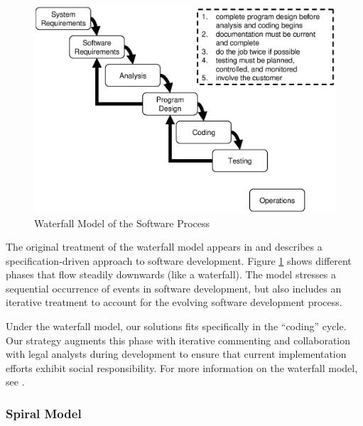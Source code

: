 \begin{figure}
\begin{center}
\includegraphics[scale=0.66]{images/waterfall.eps}
\end{center}
\caption{Waterfall Model of the Software Process}
\label{fig:waterfall}
\end{figure}

The original treatment of the waterfall model appears in \cite{Royce1970} and
describes a specification-driven approach to software development. Figure
\ref{fig:waterfall} shows different phases that flow steadily downwards (like a
waterfall). The model stresses a sequential occurrence of events in software
development, but also includes an iterative treatment to account for the 
evolving software development process.

Under the waterfall model, our solutions fits specifically in the ``coding''
cycle. Our strategy augments this phase with iterative commenting and
collaboration with legal analysts during development to ensure that current
implementation efforts exhibit social responsibility. For more information on
the waterfall model, see \cite{Royce1970}.

\subsubsection{Spiral Model}\label{spiral}

